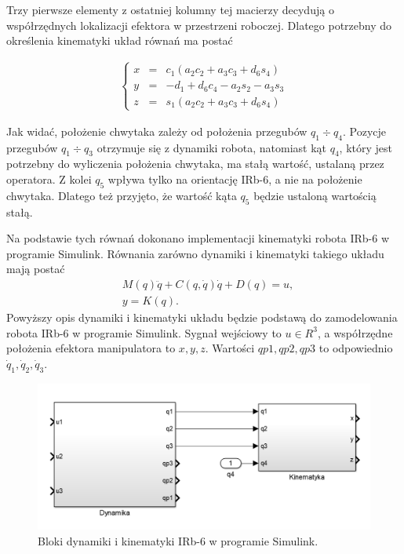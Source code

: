 \documentclass[eng,printmode]{mgr}
\begin{document}
Trzy pierwsze elementy z ostatniej kolumny tej macierzy decydują o współrzędnych lokalizacji efektora w przestrzeni roboczej. Dlatego potrzebny do określenia kinematyki układ równań ma postać

\begin{eqnarray}
\left\{ \begin{array}{lll}
x&=& c_1(a_2c_2+a_3c_3+d_6s_4)\\ 
y&=&-d_1+d_6c_4-a_2s_2-a_3s_3\\ 
z&=&s_1(a_2c_2+a_3c_3+d_6s_4)  \label{row2.30}
\end{array} \right.
\end{eqnarray}




Jak widać, położenie chwytaka zależy od położenia przegubów $q_1 \div q_4$. Pozycje przegubów $q_1\div q_3$ otrzymuje się z dynamiki robota, natomiast kąt $q_4$, który jest potrzebny do wyliczenia położenia chwytaka, ma stałą wartość, ustalaną przez operatora. Z kolei $q_5$ wpływa tylko na orientację IRb-6, a nie na położenie chwytaka.  Dlatego też przyjęto, że wartość kąta $q_5$ będzie ustaloną wartością stałą.


Na podstawie tych równań dokonano implementacji kinematyki robota IRb-6 w programie Simulink. Równania zarówno dynamiki i kinematyki takiego układu mają postać
\begin{eqnarray}
&M(q)\ddot{q}+C(q, \dot{q})\dot{q} + D(q)=u ,\label{row2.5}\\
&y=K(q). \label{row2.6}
\end{eqnarray}
Powyższy opis dynamiki i kinematyki układu będzie podstawą do zamodelowania robota IRb-6 w programie Simulink.
Sygnał wejściowy to $u ∈ R^3$, a współrzędne położenia efektora manipulatora to $x, y, z$. Wartości $qp1, qp2, qp3$ to odpowiednio $\dot{q}_1, \dot{q}_2, \dot{q}_3$. 
\begin{figure}[!ht]
\centering
\includegraphics[width=1.1\textwidth]{01.png}
\caption{\label{fig:blok1}Bloki dynamiki i kinematyki IRb-6 w programie Simulink.}
\label{rys1}
\end{figure}
\end{document}
